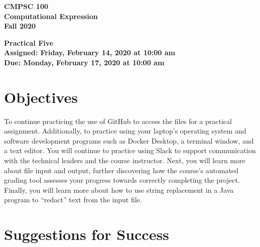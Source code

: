 \documentclass[11pt]{article}
\newcommand{\assignmentduedate}{February 17}
\newcommand{\assignmentassignedate}{February 14}
\newcommand{\assignmentnumber}{Five}
\newcommand{\labyear}{2020}
\newcommand{\labdueday}{Monday}
\newcommand{\labassignday}{Friday}
\newcommand{\labtime}{10:00 am}
\newcommand{\assigneddate}{Assigned: \labassignday, \assignmentassignedate, \labyear{} at \labtime{}}
\newcommand{\duedate}{Due: \labdueday, \assignmentduedate, \labyear{} at \labtime{}}
\newcommand{\labtitle}[1]
{
  \begin{center}
    \begin{center}
      \bf
      CMPSC 100\\Computational Expression\\
      Fall 2020\\
      \medskip
    \end{center}
    \bf
    #1
  \end{center}
}
\begin{document}
\thispagestyle{empty}

\labtitle{Practical \assignmentnumber{} \\ \assigneddate{} \\ \duedate{}}

\section*{Objectives}

To continue practicing the use of GitHub to access the files for a practical
assignment. Additionally, to practice using your laptop's operating system and
software development programs such as Docker Desktop, a terminal window, and a
text editor. You will continue to practice using Slack to support communication
with the technical leaders and the course instructor. Next, you will learn
more about file input and output, further discovering how the course's automated
grading tool assesses your progress towards correctly completing the project.
Finally, you will learn more about how to use string replacement in a Java
program to ``redact'' text from the input file.

\section*{Suggestions for Success}
\end{document}
